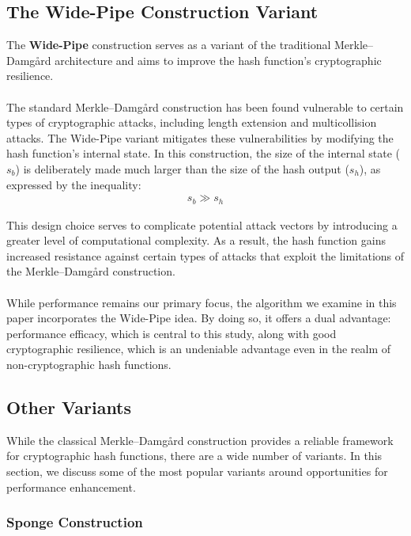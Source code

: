 \documentclass[10pt]{article}
\begin{document}
\clearpage
\subsection{The Wide-Pipe Construction Variant} \label{widepipe}

The \textbf{Wide-Pipe} construction serves as a variant of the traditional Merkle–Damgård architecture and aims to improve the hash function's cryptographic resilience.\\\\
The standard Merkle–Damgård construction has been found vulnerable to certain types of cryptographic attacks, including length extension and multicollision attacks. The Wide-Pipe variant mitigates these vulnerabilities by modifying the hash function's internal state.
In this construction, the size of the internal state (\(s_b\)) is deliberately made much larger than the size of the hash output
(\(s_h\)), as expressed by the inequality:
\begin{align*}
    s_b \gg s_h
\end{align*}

This design choice serves to complicate potential attack vectors by introducing a greater level of computational complexity.
As a result, the hash function gains increased resistance against certain types of attacks that exploit the limitations of the Merkle–Damgård construction.\\\\
While performance remains our primary focus, the algorithm we examine in this paper incorporates the Wide-Pipe idea. By doing so, it offers a dual advantage: performance efficacy, which is central to this study, along with good cryptographic resilience, which is an undeniable advantage even in the realm of non-cryptographic hash functions.

\subsection{Other Variants}

While the classical Merkle–Damgård construction provides a reliable framework for cryptographic hash functions, there are a wide number of variants\cite{merkle_damgard_alternatives_review}. In this section, we discuss some of the most popular variants around opportunities for performance enhancement.

\subsubsection{Sponge Construction}
\end{document}
